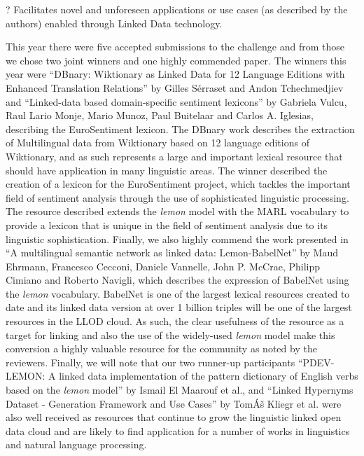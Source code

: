 {\large{}? }Facilitates novel and unforeseen applications or use cases (as described 
by the authors) enabled through Linked Data technology.

\vspace{13pt}
\leftskip=0pt
\parindent=0pt
This year there were five accepted submissions to the challenge and from those 
we chose two joint winners and one highly commended paper. The winners this year 
were ``DBnary: Wiktionary as Linked Data for 12 Language Editions with Enhanced 
Translation Relations'' by Gilles Sérraset and Andon Tchechmedjiev and ``Linked-data 
based domain-specific sentiment lexicons'' by Gabriela Vulcu, Raul Lario Monje, 
Mario Munoz, Paul Buitelaar and Carlos A. Iglesias, describing the EuroSentiment 
lexicon. The DBnary work describes the extraction of Multilingual data from Wiktionary 
based on 12 language editions of Wiktionary, and as such represents a large and 
important lexical resource that should have application in many linguistic areas. 
The winner described the creation of a lexicon for the EuroSentiment project, which 
tackles the important field of sentiment analysis through the use of sophisticated 
linguistic processing. The resource described extends the \textit{lemon} model 
with the MARL vocabulary to provide a lexicon that is unique in the field of sentiment 
analysis due to its linguistic sophistication. Finally, we also highly commend 
the work presented in ``A multilingual semantic network as linked data: Lemon-BabelNet'' 
by Maud Ehrmann, Francesco Cecconi, Daniele Vannelle, John P. McCrae, Philipp Cimiano 
and Roberto Navigli, which describes the expression of BabelNet using the \textit{lemon} 
vocabulary. BabelNet is one of the largest lexical resources created to date and 
its linked data version at over 1 billion triples will be one of the largest resources 
in the LLOD cloud. As such, the clear usefulness of the resource as a target for 
linking and also the use of the widely-used \textit{lemon} model make this conversion 
a highly valuable resource for the community as noted by the reviewers. Finally, 
we will note that our two runner-up participants ``PDEV-LEMON: A linked data implementation 
of the pattern dictionary of English verbs based on the \textit{lemon} model'' 
by Ismail El Maarouf et al., and ``Linked Hypernyms Dataset - Generation Framework 
and Use Cases'' by TomÁš Kliegr et al. were also well received as resources that 
continue to grow the linguistic linked open data cloud and are likely to find application 
for a number of works in linguistics and natural language processing.
